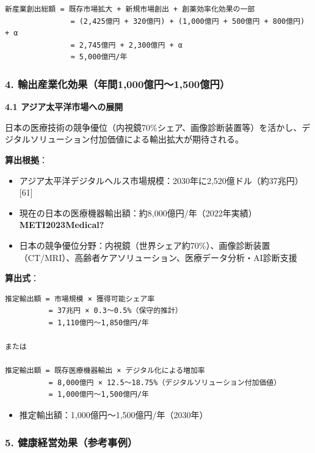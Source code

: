 \documentclass[
  a4paper,
  a4paper,
  11pt]{ltjsbook}
\providecommand{\tightlist}{%
  \setlength{\itemsep}{0pt}\setlength{\parskip}{0pt}}
\begin{document}
\begin{verbatim}
新産業創出総額 = 既存市場拡大 + 新規市場創出 + 創薬効率化効果の一部
               = (2,425億円 + 320億円) + (1,000億円 + 500億円 + 800億円) + α
               = 2,745億円 + 2,300億円 + α
               ≈ 5,000億円/年
\end{verbatim}

\subsubsection{4.
輸出産業化効果（年間1,000億円〜1,500億円）}\label{ux8f38ux51faux7523ux696dux5316ux52b9ux679cux5e74ux95931000ux5104ux51861500ux5104ux5186}

\textbf{4.1 アジア太平洋市場への展開}

日本の医療技術の競争優位（内視鏡70\%シェア、画像診断装置等）を活かし、デジタルソリューション付加価値による輸出拡大が期待される。

\textbf{算出根拠}：

\begin{itemize}
\tightlist
\item
  アジア太平洋デジタルヘルス市場規模：2030年に2,520億ドル（約37兆円）{[}61{]}
\item
  現在の日本の医療機器輸出額：約8,000億円/年（2022年実績）\textbf{METI2023Medical?}
\item
  日本の競争優位分野：内視鏡（世界シェア約70\%）、画像診断装置（CT/MRI）、高齢者ケアソリューション、医療データ分析・AI診断支援
\end{itemize}

\textbf{算出式}：

\begin{verbatim}
推定輸出額 = 市場規模 × 獲得可能シェア率
          = 37兆円 × 0.3〜0.5%（保守的推計）
          = 1,110億円〜1,850億円/年

または

推定輸出額 = 既存医療機器輸出 × デジタル化による増加率
          = 8,000億円 × 12.5〜18.75%（デジタルソリューション付加価値）
          = 1,000億円〜1,500億円/年
\end{verbatim}

\begin{itemize}
\tightlist
\item
  推定輸出額：1,000億円〜1,500億円/年（2030年）
\end{itemize}

\subsubsection{5.
健康経営効果（参考事例）}\label{ux5065ux5eb7ux7d4cux55b6ux52b9ux679cux53c2ux8003ux4e8bux4f8b}
\end{document}
